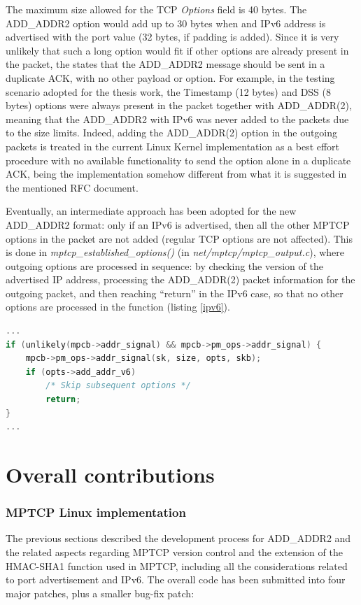 The maximum size allowed for the TCP \textit{Options} field is 40 bytes. The ADD\_ADDR2 option would add up to 30 bytes when and IPv6 address is advertised with the port value (32 bytes, if padding is added). Since it is very unlikely that such a long option would fit if other options are already present in the packet, the  states that the ADD\_ADDR2 message should be sent in a duplicate ACK, with no other payload or option. 
For example, in the testing scenario adopted for the thesis work, the Timestamp (12 bytes) and DSS (8 bytes) options were always present in the packet together with ADD\_ADDR(2), meaning that the ADD\_ADDR2 with IPv6 was never added to the packets due to the size limits. Indeed, adding the ADD\_ADDR(2) option in the outgoing packets is treated in the current Linux Kernel implementation as a best effort procedure with no available functionality to send the option alone in a duplicate ACK, being the implementation somehow different from what it is suggested in the mentioned RFC document.

Eventually, an intermediate approach has been adopted for the new ADD\_ADDR2 format: only if an IPv6 is advertised, then all the other MPTCP options in the packet are not added (regular TCP options are not affected). This is done in \textit{mptcp\_established\_options()} (in \textit{ net/mptcp/mptcp\_output.c}), where outgoing options are processed in sequence: by checking the version of the advertised IP address, processing the ADD\_ADDR(2) packet information for the outgoing packet, and then reaching ``return'' in the IPv6 case, so that no other options are processed in the function (listing \ref{ipv6}).

\begin{lstlisting}[language=c, caption=Other MPTCP options are not added to the outgoing packet if ADD\_ADDR2 is present (IPv6 case only), label=ipv6]
...
if (unlikely(mpcb->addr_signal) && mpcb->pm_ops->addr_signal) {
	mpcb->pm_ops->addr_signal(sk, size, opts, skb);
	if (opts->add_addr_v6)
		/* Skip subsequent options */
		return;
}
...
\end{lstlisting}


\section{Overall contributions}
\label{otherc}

\subsubsection{MPTCP Linux implementation}
The previous sections described the development process for ADD\_ADDR2 and the related aspects regarding MPTCP version control and the extension of the HMAC-SHA1 function used in MPTCP, including all the considerations related to port advertisement and IPv6. 
The overall code has been submitted into four major patches, plus a smaller bug-fix patch:

